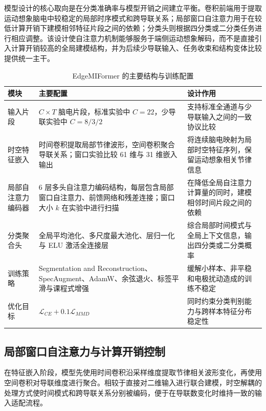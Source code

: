 模型设计的核心取向是在分类准确率与模型开销之间建立平衡。卷积前端用于提取运动想象脑电中较稳定的局部时序模式和跨导联关系；局部窗口自注意力用于在较低计算开销下建模相邻特征片段之间的依赖；分类头则根据四分类或二分类任务进行相应调整。该设计使自注意力机制能够服务于端侧运动想象解码，而不是直接引入计算开销较高的全局建模结构，并为后续少导联输入、任务收束和结构变体比较提供统一主干。

\begin{table}[htbp]
    \centering
    \small
    \caption{EdgeMIFormer 的主要结构与训练配置}
    \label{tab:edgemiformer_config}
    \begin{tabularx}{\textwidth}{p{2.6cm}p{4.4cm}>{\raggedright\arraybackslash}X}
        \hline
        模块 & 主要配置 & 设计作用 \\
        \hline
        输入片段 & $C \times T$ 脑电片段，标准实验中 $C=22$，少导联实验中 $C=8/3/2$ & 支持标准全通道与少导联输入之间的一致协议比较 \\
        时空特征嵌入 & 时间卷积提取局部节律波形，空间卷积聚合导联关系；窗口实验比较 61 维与 31 维嵌入输出 & 将连续脑电映射为局部时空特征序列，保留运动想象相关节律信息 \\
        局部自注意力编码器 & 6 层多头自注意力编码结构，每层包含局部窗口自注意力、前馈网络和残差连接；窗口大小 $k$ 在实验中进行扫描 & 在降低全局自注意力计算量的同时，建模相邻时间片段之间的依赖 \\
        分类聚合头 & 全局平均池化、多尺度最大池化、层归一化与 ELU 激活全连接层 & 综合局部时间模式与全局上下文信息，输出四分类或二分类概率 \\
        训练策略 & Segmentation and Reconstruction、SpecAugment、AdamW、余弦退火、标签平滑与课程式增强 & 缓解小样本、非平稳和电极扰动造成的训练不稳定 \\
        优化目标 & $\mathcal{L}_{CE}+0.1\mathcal{L}_{MMD}$ & 同时约束分类判别能力与跨样本特征分布稳定性 \\
        \hline
    \end{tabularx}
\end{table}

\subsection{局部窗口自注意力与计算开销控制}
在特征嵌入阶段，模型先使用时间卷积沿采样维度提取节律相关波形变化，再使用空间卷积对导联维度进行聚合。相较于直接对二维输入进行联合建模，时空解耦的处理方式使时间模式和跨导联关系分别被编码，便于在导联数变化时维持一致的输入适配流程。


